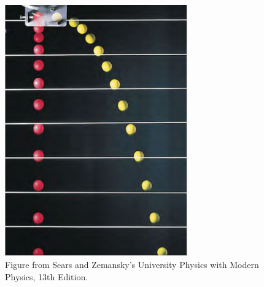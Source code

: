 \documentclass[]{beamer}
\begin{document}
\begin{frame}
\begin{columns}[c]
          \begin{figure}[h!]  
         \includegraphics[width=0.7\textwidth]{images/18.jpg}
          \caption{ {\tiny Figure from Sears and Zemansky's University Physics 
          with Modern Physics, 13th Edition.} }
       \end{figure}
       
       
       
          \end{columns}

          


\end{frame}



\end{document}
